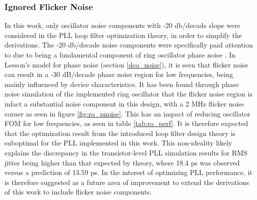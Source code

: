 	\subsubsection{Ignored Flicker Noise}
	In this work, only oscillator noise components with -20 db/decade slope were considered in the PLL loop filter optimization theory, in order to simplify the derivations. The -20 db/decade noise components were specifically paid attention to due to being a fundamental component of ring oscillator phase noise \cite{Navid2005}. In Leeson's model for phase noise (section \ref{dco_noise}), it is seen that flicker noise can result in a -30 dB/decade phase noise region for low frequencies, being mainly influenced by device characteristics. It has been found through phase noise simulation of the implemented ring oscillator that the flicker noise region is infact a substantial noise component in this design, with a 2 MHz flicker noise corner as seen in figure \ref{fig:ro_pnoise}. This has an impact of reducing oscillator FOM for low frequencies, as seen in table \ref{tab:ro_perf}. It is therefore expected that the optimization result from the introduced loop filter design theory is suboptimal for the PLL implemented in this work. This non-ideality likely explains the discrepancy in the transistor-level PLL simulation results for RMS jitter being higher than that expected by theory, where 18.4 ps was observed versus a prediction of 13.59 ps. In the interest of optimizing PLL performance, it is therefore suggested as a future area of improvement to extend the derivations of this work to include flicker noise components.


